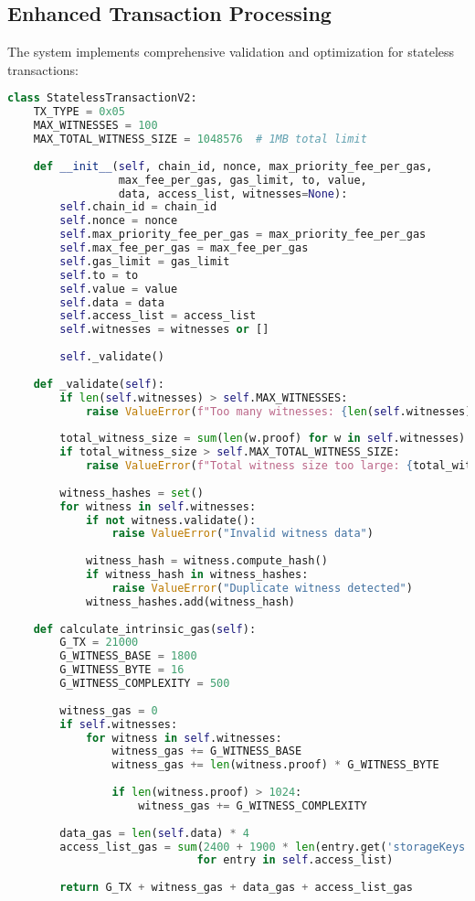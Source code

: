 \documentclass{article}
\begin{document}
\subsection{Enhanced Transaction Processing}

The system implements comprehensive validation and optimization for stateless transactions:

\begin{lstlisting}[language=Python,caption={Stateless Transaction Implementation},label={lst:tx-impl}]
class StatelessTransactionV2:
    TX_TYPE = 0x05
    MAX_WITNESSES = 100
    MAX_TOTAL_WITNESS_SIZE = 1048576  # 1MB total limit
    
    def __init__(self, chain_id, nonce, max_priority_fee_per_gas, 
                 max_fee_per_gas, gas_limit, to, value, 
                 data, access_list, witnesses=None):
        self.chain_id = chain_id
        self.nonce = nonce
        self.max_priority_fee_per_gas = max_priority_fee_per_gas
        self.max_fee_per_gas = max_fee_per_gas
        self.gas_limit = gas_limit
        self.to = to
        self.value = value
        self.data = data
        self.access_list = access_list
        self.witnesses = witnesses or []
        
        self._validate()
    
    def _validate(self):
        if len(self.witnesses) > self.MAX_WITNESSES:
            raise ValueError(f"Too many witnesses: {len(self.witnesses)}")
        
        total_witness_size = sum(len(w.proof) for w in self.witnesses)
        if total_witness_size > self.MAX_TOTAL_WITNESS_SIZE:
            raise ValueError(f"Total witness size too large: {total_witness_size}")
        
        witness_hashes = set()
        for witness in self.witnesses:
            if not witness.validate():
                raise ValueError("Invalid witness data")
            
            witness_hash = witness.compute_hash()
            if witness_hash in witness_hashes:
                raise ValueError("Duplicate witness detected")
            witness_hashes.add(witness_hash)
    
    def calculate_intrinsic_gas(self):
        G_TX = 21000
        G_WITNESS_BASE = 1800
        G_WITNESS_BYTE = 16
        G_WITNESS_COMPLEXITY = 500
        
        witness_gas = 0
        if self.witnesses:
            for witness in self.witnesses:
                witness_gas += G_WITNESS_BASE
                witness_gas += len(witness.proof) * G_WITNESS_BYTE
                
                if len(witness.proof) > 1024:
                    witness_gas += G_WITNESS_COMPLEXITY
        
        data_gas = len(self.data) * 4
        access_list_gas = sum(2400 + 1900 * len(entry.get('storageKeys', [])) 
                             for entry in self.access_list)
        
        return G_TX + witness_gas + data_gas + access_list_gas
\end{lstlisting}
\end{document}
